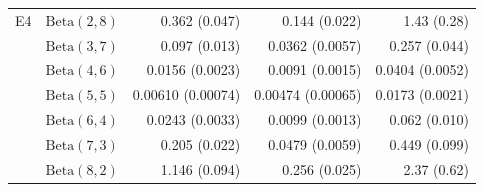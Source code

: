 \begin{tabular}{llrrr}
E4 & $\mathrm{Beta}(2,8)$ & 0.362 (0.047) & 0.144 (0.022) & 1.43 (0.28) \\
 & $\mathrm{Beta}(3,7)$ & 0.097 (0.013) & 0.0362 (0.0057) & 0.257 (0.044) \\
 & $\mathrm{Beta}(4,6)$ & 0.0156 (0.0023) & 0.0091 (0.0015) & 0.0404 (0.0052) \\
 & $\mathrm{Beta}(5,5)$ & 0.00610 (0.00074) & 0.00474 (0.00065) & 0.0173 (0.0021) \\
 & $\mathrm{Beta}(6,4)$ & 0.0243 (0.0033) & 0.0099 (0.0013) & 0.062 (0.010) \\
 & $\mathrm{Beta}(7,3)$ & 0.205 (0.022) & 0.0479 (0.0059) & 0.449 (0.099) \\
 & $\mathrm{Beta}(8,2)$ & 1.146 (0.094) & 0.256 (0.025) & 2.37 (0.62) \\
\hline
\end{tabular}
